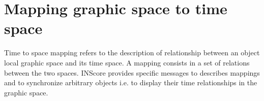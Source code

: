 \documentclass[a4paper,twoside]{report}
\newcommand{\toplevel}[1]	{\chapter{#1}}
\newcommand{\OSC}[1]		{\texttt{#1}}
\begin{document}


\toplevel{Mapping graphic space to time space}
\label{mapping}

Time to space mapping refers to the description of relationship between an object local graphic space and its time space. A mapping consists in a set of relations between the two spaces. INScore provides specific messages to describes mappings and to synchronize arbitrary objects i.e. to display their time relationships in the graphic space.
\end{document}
